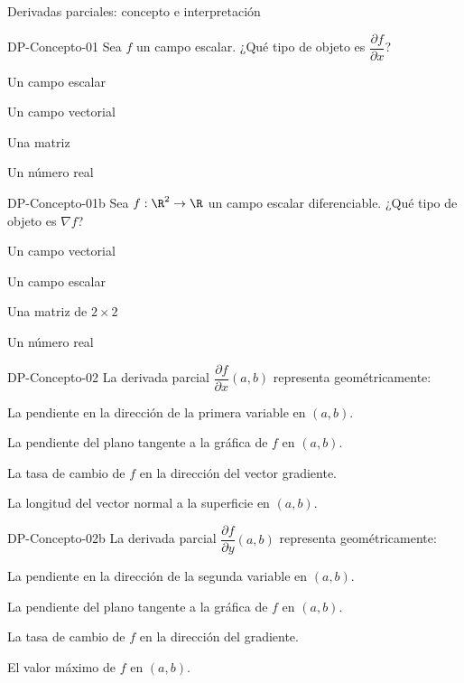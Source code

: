 \documentclass[a4,11pt]{aleph-notas}
\begin{document}
\begin{quiz}{Derivadas parciales: concepto e interpretación}

\begin{multi}[]%
    {DP-Concepto-01}
    Sea $f$ un campo escalar. ¿Qué tipo de objeto es $\dfrac{\partial f}{\partial x}$?
    \item* Un campo escalar
    \item Un campo vectorial
    \item Una matriz
    \item Un número real
\end{multi}

\begin{multi}[]%
    {DP-Concepto-01b}
    Sea $f:\R^2\to\R$ un campo escalar diferenciable. ¿Qué tipo de objeto es $\nabla f$?
    \item* Un campo vectorial
    \item Un campo escalar
    \item Una matriz de $2\times 2$
    \item Un número real
\end{multi}

\begin{multi}[]%
    {DP-Concepto-02}
    La derivada parcial $\dfrac{\partial f}{\partial x}(a,b)$ representa geométricamente:
    \item* La pendiente en la dirección de la primera variable en $(a,b)$.
    \item La pendiente del plano tangente a la gráfica de $f$ en $(a,b)$.
    \item La tasa de cambio de $f$ en la dirección del vector gradiente.
    \item La longitud del vector normal a la superficie en $(a,b)$.
\end{multi}

\begin{multi}[]%
    {DP-Concepto-02b}
    La derivada parcial $\dfrac{\partial f}{\partial y}(a,b)$ representa geométricamente:
    \item* La pendiente en la dirección de la segunda variable en $(a,b)$.
    \item La pendiente del plano tangente a la gráfica de $f$ en $(a,b)$.
    \item La tasa de cambio de $f$ en la dirección del gradiente.
    \item El valor máximo de $f$ en $(a,b)$.
\end{multi}


\end{quiz}
\end{document}
